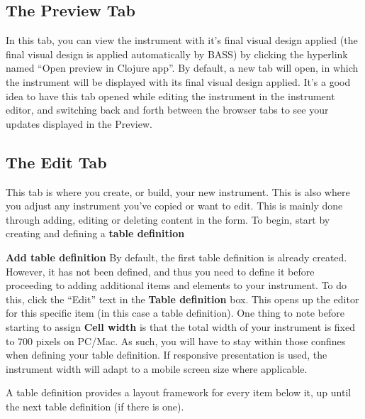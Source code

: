 \documentclass[]{book}
\begin{document}
\hypertarget{the-preview-tab}{%
\subsection{The Preview Tab}\label{the-preview-tab}}

In this tab, you can view the instrument with it's final visual design applied (the final visual design is applied automatically by BASS) by clicking the hyperlink named ``Open preview in Clojure app''.
By default, a new tab will open, in which the instrument will be displayed with its final visual design applied. It's a good idea to have this tab opened while editing the instrument in the instrument editor, and switching back and forth between the browser tabs to see your updates displayed in the Preview.

\hypertarget{the-edit-tab}{%
\subsection{The Edit Tab}\label{the-edit-tab}}

This tab is where you create, or build, your new instrument. This is also where you adjust any instrument you've copied or want to edit. This is mainly done through adding, editing or deleting content in the form.
To begin, start by creating and defining a \textbf{table definition}

\textbf{Add table definition}
By default, the first table definition is already created. However, it has not been defined, and thus you need to define it before proceeding to adding additional items and elements to your instrument. To do this, click the ``Edit'' text in the \textbf{Table definition} box. This opens up the editor for this specific item (in this case a table definition).
One thing to note before starting to assign \textbf{Cell width} is that the total width of your instrument is fixed to 700 pixels on PC/Mac. As such, you will have to stay within those confines when defining your table definition.
If responsive presentation is used, the instrument width will adapt to a mobile screen size where applicable.

A table definition provides a layout framework for every item below it, up until the next table definition (if there is one).
\end{document}
